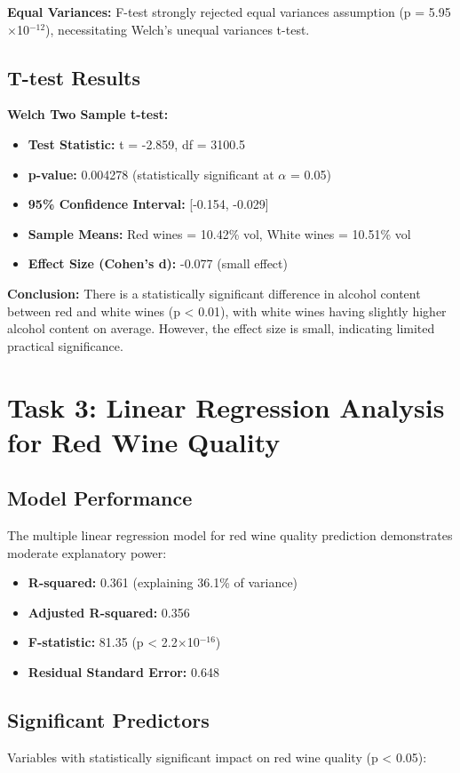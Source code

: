 \textbf{Equal Variances:} F-test strongly rejected equal variances assumption (p = 5.95$\times$10$^{-12}$), necessitating Welch's unequal variances t-test.

\subsection{T-test Results}
\textbf{Welch Two Sample t-test:}
\begin{itemize}
\item \textbf{Test Statistic:} t = -2.859, df = 3100.5
\item \textbf{p-value:} 0.004278 (statistically significant at $\alpha$ = 0.05)
\item \textbf{95\% Confidence Interval:} [-0.154, -0.029]
\item \textbf{Sample Means:} Red wines = 10.42\% vol, White wines = 10.51\% vol
\item \textbf{Effect Size (Cohen's d):} -0.077 (small effect)
\end{itemize}

\textbf{Conclusion:} There is a statistically significant difference in alcohol content between red and white wines (p < 0.01), with white wines having slightly higher alcohol content on average. However, the effect size is small, indicating limited practical significance.

\section{Task 3: Linear Regression Analysis for Red Wine Quality}

\subsection{Model Performance}
The multiple linear regression model for red wine quality prediction demonstrates moderate explanatory power:
\begin{itemize}
\item \textbf{R-squared:} 0.361 (explaining 36.1\% of variance)
\item \textbf{Adjusted R-squared:} 0.356
\item \textbf{F-statistic:} 81.35 (p < 2.2$\times$10$^{-16}$)
\item \textbf{Residual Standard Error:} 0.648
\end{itemize}

\subsection{Significant Predictors}
Variables with statistically significant impact on red wine quality (p < 0.05):

